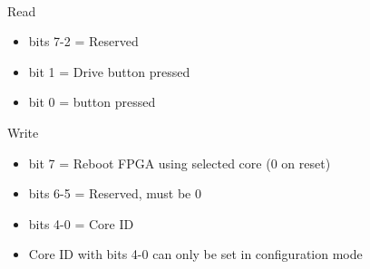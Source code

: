 \\
Read
\begin{itemize}
\item bits 7-2 = Reserved
\item bit 1 = Drive button pressed
\item bit 0 =  button pressed
\end{itemize}
Write
\begin{itemize}
\item bit 7 = Reboot FPGA using selected core (0 on reset)
\item bits 6-5 = Reserved, must be 0
\item bits 4-0 = Core ID
\item[] Core ID with bits 4-0 can only be set in configuration mode
\end{itemize}

